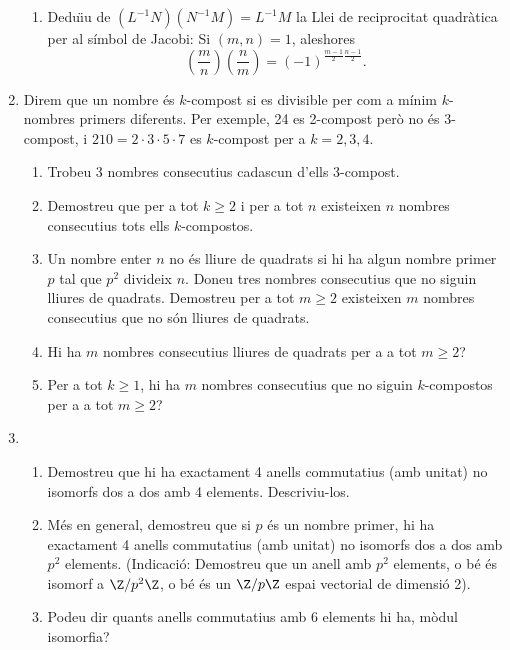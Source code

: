 \begin{enumerate}[leftmargin=*]
\begin{enumerate}
\item Dedu\"{\i}u de $(L^{-1}N)(N^{-1}M)=L^{-1}M$ la Llei de reciprocitat quadràtica per al símbol de
Jacobi:  Si $(m,n)=1$, aleshores
$$
\left(\frac{m}{n} \right) \left(\frac{n}{m}
\right)=(-1)^{\frac{m-1}{2}\frac{n-1}{2}}.
$$

\end{enumerate}

\item Direm que un nombre és $k$-compost si es divisible per
com a mínim $k$-nombres primers diferents. Per exemple, 24 es
2-compost però no és 3-compost, i $210=2\cdot 3 \cdot 5 \cdot 7$ es
$k$-compost per a $k=2,3,4$.

\begin{enumerate}
\item Trobeu 3 nombres consecutius cadascun d'ells 3-compost.

\item Demostreu que per a tot $k\ge 2$ i per a tot $n$
existeixen $n$ nombres consecutius tots ells
$k$-compostos.

\item Un nombre enter $n$ no és lliure de quadrats si hi ha
algun nombre primer $p$ tal que $p^2$ divideix $n$. Doneu tres
nombres consecutius que no siguin lliures de quadrats. Demostreu per
a tot $m\ge 2$ existeixen $m$ nombres consecutius que no són lliures
de quadrats.

\item Hi ha $m$ nombres consecutius lliures de quadrats per a
a tot $m\ge 2$?

\item Per a tot $k\ge 1$, hi ha $m$ nombres consecutius que no
siguin $k$-compostos per a a tot $m\ge 2$?

\end{enumerate}

\item 
\begin{enumerate}
    \item  Demostreu que hi ha exactament 4 anells
commutatius (amb unitat) no isomorfs dos a dos amb 4 elements.
Descriviu-los.

\item Més en general, demostreu que si $p$ és un nombre
primer, hi ha exactament 4 anells commutatius (amb unitat) no
isomorfs dos a dos amb $p^2$ elements. (Indicació: Demostreu que un
anell amb $p^2$ elements, o bé és isomorf a $\Z/p^2\Z$, o bé és un
$\Z/p\Z$ espai vectorial de dimensió 2).

\item Podeu dir quants anells commutatius amb 6 elements hi
ha, mòdul isomorfia?
\end{enumerate}


\end{enumerate}
